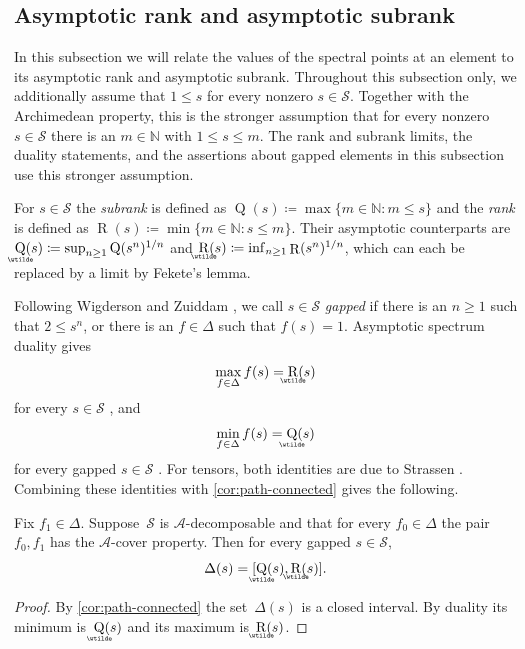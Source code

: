 \documentclass[11pt,letterpaper]{article}
\DeclareMathOperator{\subrank}{Q}
\DeclareMathOperator{\asympsubrank}{\underaccent{\wtilde}{Q}}
\DeclareMathOperator{\asymprank}{\underaccent{\wtilde}{R}}
\DeclareMathOperator{\tensorrank}{R}
\newcommand{\NN}{\mathbb{N}}
\begin{document}
\subsection{Asymptotic rank and asymptotic subrank}\label{sec:asymptotic-rank}

In this subsection we will relate the values of the spectral points at an element to its asymptotic rank and asymptotic subrank. Throughout this subsection only, we additionally assume that $1 \leq s$ for every nonzero $s \in \mathcal{S}$. Together with the Archimedean property, this is the stronger assumption that for every nonzero $s \in \mathcal{S}$ there is an $m \in \NN$ with $1 \leq s \leq m$. The rank and subrank limits, the duality statements, and the assertions about gapped elements in this subsection use this stronger assumption.

For $s \in \mathcal{S}$ the \emph{subrank} is defined as $
\subrank(s) \coloneqq \max\{m \in \NN : m \leq s\}$ and the \emph{rank} is defined as  $\tensorrank(s) \coloneqq \min\{m \in \NN : s \leq m\}$.
Their asymptotic counterparts are $\asympsubrank(s) \coloneqq \sup_{n\geq1} \subrank(s^n)^{1/n}$ and $\asymprank(s) \coloneqq \inf_{n\geq1} \tensorrank(s^n)^{\smash{1/n}}$, which can each be replaced by a limit by Fekete's lemma.

Following Wigderson and Zuiddam \cite[Definition~3.27]{wigderson2022asymptotic}, we call $s \in \mathcal{S}$ \emph{gapped} if there is an $n \geq 1$ such that $2 \leq s^n$, or there is an $f \in \Delta$ such that $f(s) = 1$. Asymptotic spectrum duality gives
\[
\max_{f \in \Delta} f(s) = \asymprank(s)
\]
for every $s \in \mathcal{S}$ \cite[Corollary~3.30]{wigderson2022asymptotic}, and
\[
\min_{f \in \Delta} f(s) = \asympsubrank(s)
\]
for every gapped $s \in \mathcal{S}$ \cite[Corollary~3.31]{wigderson2022asymptotic}. For tensors, both identities are due to Strassen \cite[Theorem~3.8]{strassen1988asymptotic}. Combining these identities with \cref{cor:path-connected} gives the following.

\begin{corollary}\label{cor:interval}
Fix $f_1 \in \Delta$. Suppose~$\mathcal{S}$ is $\mathcal{A}$-decomposable and that for every $f_0 \in \Delta$ the pair $f_0, f_1$ has the $\mathcal{A}$-cover property. Then for every gapped $s \in \mathcal{S}$,
\[
\Delta(s) = [\asympsubrank(s), \asymprank(s)].
\]
\end{corollary}
\begin{proof}
By \cref{cor:path-connected} the set~$\Delta(s)$ is a closed interval. By duality its minimum is~$\asympsubrank(s)$ and its maximum is~$\asymprank(s)$.
\end{proof}
\end{document}
